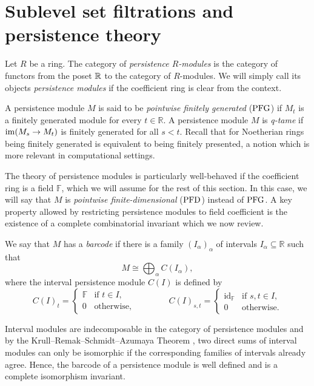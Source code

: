 
\section{Sublevel set filtrations and persistence theory} \label{s:persistence}

Let $R$ be a ring.
The category of \emph{persistence $R$-modules} is the category of functors from the poset $\mathbb{R}$ to the category of $R$-modules.
We will simply call its objects \emph{persistence modules} if the coefficient ring is clear from the context. 

A persistence module $M$ is said to be \emph{pointwise finitely generated} ($\mathrm{PFG}$) if $M_{t}$ is a finitely generated module for every $t \in \mathbb{R}$.
A persistence module $M$ is \emph{q-tame} if $\operatorname{im} (M_{s} \to M_{t})$ is finitely generated for all $s < t$.
Recall that for Noetherian rings being finitely generated is equivalent to being finitely presented, a notion which is more relevant in computational settings.

The theory of persistence modules is particularly well-behaved if the coefficient ring is a field $\mathbb{F}$, which we will assume for the rest of this section.
In this case, we will say that $M$ is \emph{pointwise finite-dimensional} ($\mathrm{PFD}$) instead of $\mathrm{PFG}$.
A key property allowed by restricting persistence modules to field coefficient is the existence of a complete combinatorial invariant which we now review.

We say that $M$ has a \emph{barcode} if there is a family $(I_{\alpha})_{\alpha}$ of intervals $I_{\alpha}\subseteq\mathbb{R}$ such that
\[
M \cong \bigoplus_{\alpha} C(I_{\alpha}),
\]
where the interval persistence module $C(I)$ is defined by
\begin{equation} \label{e:interval module}
    C(I)_t =
    \begin{cases}
        \mathbb{F} & \text{if } t\in I, \\
        0          & \text{otherwise},
    \end{cases}
    \qquad
    \qquad
    C(I)_{s, t} =
    \begin{cases}
        \operatorname{id}_{\mathbb{F}} & \text{if } s, t \in I,\\
        0 & \text{otherwise}.
    \end{cases}    
\end{equation}

Interval modules are indecomposable in the category of persistence modules and by the Krull--Remak--Schmidt--Azumaya Theorem \cite{MR37832}, two direct sums of interval modules can only be isomorphic if the corresponding families of intervals already agree. Hence, the barcode of a persistence module is well defined and is a complete isomorphism invariant.

